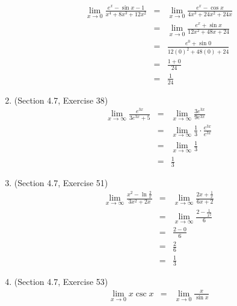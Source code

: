 \documentclass{article}
\begin{document}
\begin{enumerate}
\begin{eqnarray}
            \lim_{x \to 0}{\frac{e^x - \sin{x} - 1}{x^4 + 8x^3 + 12x^2}} &=& \lim_{x \to 0}{\frac{e^x - \cos{x}}{4x^3 + 24x^2 + 24x}} \\
                                                                         &=& \lim_{x \to 0}{\frac{e^x + \sin{x}}{12x^2 + 48x + 24}} \\
                                                                         &=& \frac{e^0 + \sin{0}}{12(0)^2 + 48(0) + 24} \\
                                                                         &=& \frac{1 + 0}{24} \\
                                                                         &=& \frac{1}{24}
        \end{eqnarray}
    \item (Section 4.7, Exercise 38)
        \begin{eqnarray}
            \lim_{x \to \infty}{\frac{e^{3x}}{3e^{3x} + 5}} &=& \lim_{x \to \infty}{\frac{3e^{3x}}{9e^{3x}}} \\
                                                            &=& \lim_{x \to \infty}{\frac{1}{3}\cdot\frac{e^{3x}}{e^{3x}}} \\
                                                            &=& \lim_{x \to \infty}{\frac{1}{3}} \\
                                                            &=& \frac{1}{3}
        \end{eqnarray}
    \item (Section 4.7, Exercise 51)
        \begin{eqnarray}
            \lim_{x \to \infty}{\frac{x^2 - \ln{\frac{2}{x}}}{3x^2 + 2x}} &=& \lim_{x \to \infty}{\frac{2x + \frac{1}{x}}{6x + 2}} \\
                                                                          &=& \lim_{x \to \infty}{\frac{2 - \frac{1}{x^2}}{6}} \\
                                                                          &=& \frac{2 - 0}{6} \\
                                                                          &=& \frac{2}{6} \\
                                                                          &=& \frac{1}{3}
        \end{eqnarray}
    \item (Section 4.7, Exercise 53)
        \begin{eqnarray}
            \lim_{x \to 0}{x\csc{x}} &=& \lim_{x \to 0}{\frac{x}{\sin{x}}} \\

\end{eqnarray}
\end{enumerate}
\end{document}
